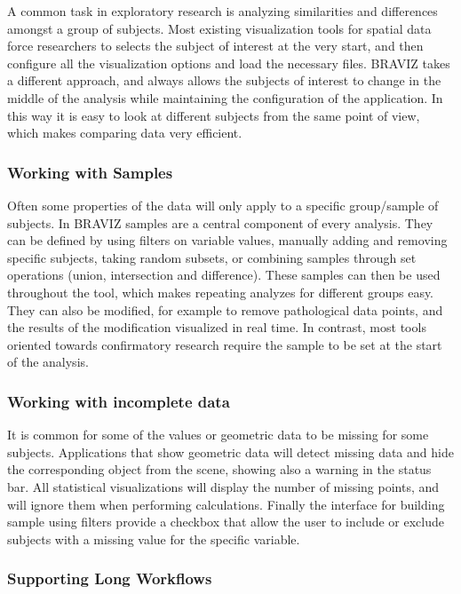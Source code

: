 \documentclass[twocolumn]{svjour3}
\begin{document}
A common task in exploratory research is analyzing similarities and differences amongst a group of subjects. Most existing visualization tools for spatial data force researchers to selects the subject of interest at the very start, and then configure all the visualization options and load the necessary files. BRAVIZ takes a different approach, and always allows the subjects of interest to change in the middle of the analysis while maintaining the configuration of the application. In this way it is easy to look at different subjects from the same point of view, which makes comparing data very efficient.  

\subsubsection{Working with Samples}

Often some properties of the data will only apply to a specific group/sample of subjects. In BRAVIZ samples are a central component of every analysis. They can be defined by using filters on variable values, manually adding and removing specific subjects, taking random subsets, or combining samples through set operations (union, intersection and difference). These samples can then be used throughout the tool, which makes repeating analyzes for different groups easy. They can also be modified, for example to remove pathological data points, and the results of the modification visualized in real time. In contrast, most tools oriented towards confirmatory research require the sample to be set at the start of the analysis.

\subsubsection{Working with incomplete data}

It is common for some of the values or geometric data to be missing for some subjects. Applications that show geometric data will detect missing data and hide the corresponding object from the scene, showing also a warning in the status bar. All statistical visualizations will display the number of missing points, and will ignore them when performing calculations. Finally the interface for building sample using filters provide a checkbox that allow the user to include or exclude subjects with a missing value for the specific variable.

\subsubsection{Supporting Long Workflows}
\end{document}
